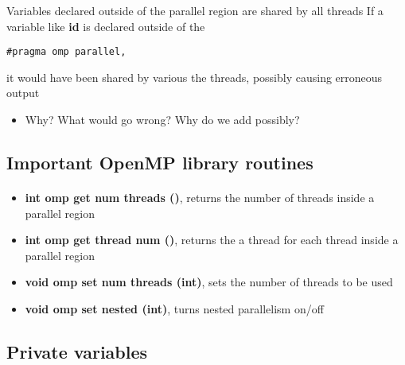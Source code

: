Variables declared outside of the parallel region are shared by all threads
If a variable like \textbf{id} is  declared outside of the 


\begin{verbatim}
#pragma omp parallel, 

\end{verbatim}

it would have been shared by various the threads, possibly causing erroneous output
\begin{itemize}
 \item Why? What would go wrong? Why do we add  possibly?
\end{itemize}

\noindent



\subsection*{Important OpenMP library routines}

\paragraph{}

\begin{itemize}
\item \textbf{int omp get num threads ()}, returns the number of threads inside a parallel region

\item \textbf{int omp get thread num ()},  returns the  a thread for each thread inside a parallel region

\item \textbf{void omp set num threads (int)}, sets the number of threads to be used

\item \textbf{void omp set nested (int)},  turns nested parallelism on/off
\end{itemize}

\noindent



\subsection*{Private variables}

